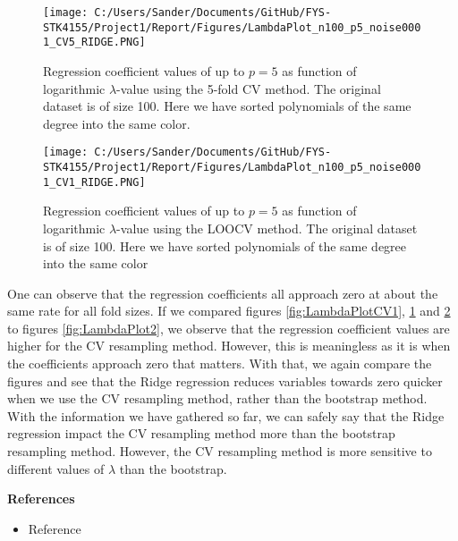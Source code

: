 \documentclass[12pt,a4paper]{article}
\begin{document}
\begin{figure}[H]
\centering
\texttt{[image: C:/Users/Sander/Documents/GitHub/FYS-STK4155/Project1/Report/Figures/LambdaPlot\_n100\_p5\_noise0001\_CV5\_RIDGE.PNG]}
\caption{\label{fig:LambdaPlotCV2} Regression coefficient values of up to $p = 5$ as function of logarithmic $\lambda$-value using the 5-fold CV method. The original dataset is of size 100. Here we have sorted polynomials of the same degree into the same color.}
\end{figure}

\begin{figure}[H]
\centering
\texttt{[image: C:/Users/Sander/Documents/GitHub/FYS-STK4155/Project1/Report/Figures/LambdaPlot\_n100\_p5\_noise0001\_CV1\_RIDGE.PNG]}
\caption{\label{fig:LambdaPlotCV3} Regression coefficient values of up to $p = 5$ as function of logarithmic $\lambda$-value using the LOOCV method. The original dataset is of size 100. Here we have sorted polynomials of the same degree into the same color}
\end{figure}

\noindent One can observe that the regression coefficients all approach zero at about the same rate for all fold sizes. If we compared figures \ref{fig:LambdaPlotCV1}, \ref{fig:LambdaPlotCV2} and \ref{fig:LambdaPlotCV3} to figures \ref{fig:LambdaPlot2}, we observe that the regression coefficient values are higher for the CV resampling method. However, this is meaningless as it is when the coefficients approach zero that matters. With that, we again compare the figures and see that the Ridge regression reduces variables towards zero quicker when we use the CV resampling method, rather than the bootstrap method.
\\
With the information we have gathered so far, we can safely say that the Ridge regression impact the CV resampling method more than the bootstrap resampling method. However, the CV resampling method is more sensitive to different values of $\lambda$ than the bootstrap. 

\newpage

\begin{center}
\Large{\textbf{References}}
\end{center}

\begin{itemize}
  \item Reference
\end{itemize}
\end{document}
